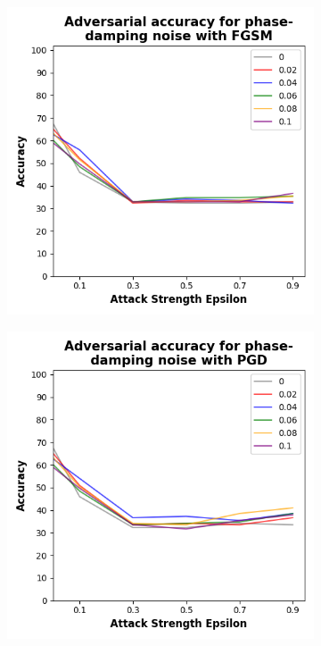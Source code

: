 \begin{figure}[!h]
  \centering

  \begin{subfigure}{0.45\textwidth}
      \includegraphics[width=\linewidth]{figures/evaluation_results/diabetes/pqc/figures/phase-damping-fgsm.png}
      \label{fig:diabetes13}
  \end{subfigure} \qquad
  \begin{subfigure}{0.45\textwidth}
      \includegraphics[width=\linewidth]{figures/evaluation_results/diabetes/pqc/figures/phase-damping-pgd.png}

\end{subfigure}
\end{figure}
